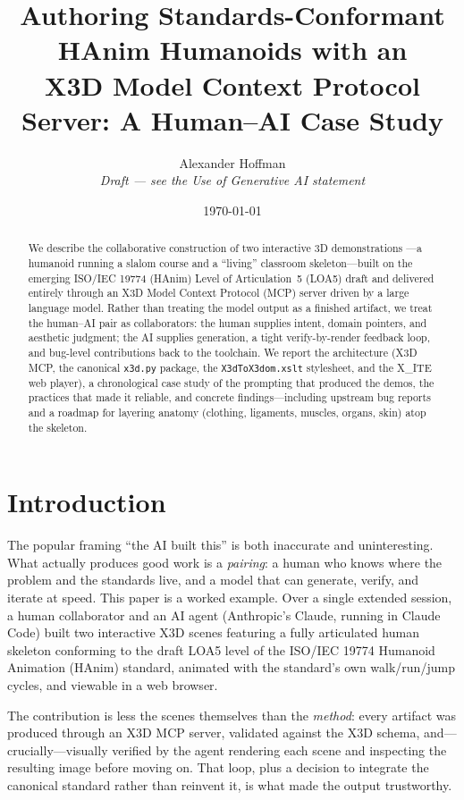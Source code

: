 \documentclass[11pt]{article}
\title{\textbf{Authoring Standards-Conformant HAnim Humanoids with an\\
X3D Model Context Protocol Server: A Human--AI Case Study}}
\author{Alexander Hoffman\\[2pt]
  \small\textit{Draft --- see the Use of Generative AI statement}}
\date{\today}
\begin{document}
\maketitle

\begin{abstract}
We describe the collaborative construction of two interactive 3D demonstrations
---a humanoid running a slalom course and a ``living'' classroom skeleton---built
on the emerging ISO/IEC 19774 (HAnim) Level of Articulation~5 (LOA5) draft and
delivered entirely through an X3D Model Context Protocol (MCP) server driven by a
large language model. Rather than treating the model output as a finished
artifact, we treat the human--AI pair as collaborators: the human supplies intent,
domain pointers, and aesthetic judgment; the AI supplies generation, a tight
verify-by-render feedback loop, and bug-level contributions back to the toolchain.
We report the architecture (X3D MCP, the canonical \texttt{x3d.py} package, the
\texttt{X3dToX3dom.xslt} stylesheet, and the X\_ITE web player), a chronological
case study of the prompting that produced the demos, the practices that made it
reliable, and concrete findings---including upstream bug reports and a roadmap
for layering anatomy (clothing, ligaments, muscles, organs, skin) atop the
skeleton.
\end{abstract}

\section{Introduction}

The popular framing ``the AI built this'' is both inaccurate and uninteresting.
What actually produces good work is a \emph{pairing}: a human who knows where the
problem and the standards live, and a model that can generate, verify, and
iterate at speed. This paper is a worked example. Over a single extended session,
a human collaborator and an AI agent (Anthropic's Claude, running in Claude Code)
built two interactive X3D scenes featuring a fully articulated human skeleton
conforming to the draft LOA5 level of the ISO/IEC 19774 Humanoid Animation
(HAnim) standard, animated with the standard's own walk/run/jump cycles, and
viewable in a web browser.

The contribution is less the scenes themselves than the \emph{method}: every
artifact was produced through an X3D MCP server, validated against the X3D
schema, and---crucially---visually verified by the agent rendering each scene and
inspecting the resulting image before moving on. That loop, plus a decision to
integrate the canonical standard rather than reinvent it, is what made the output
trustworthy.
\end{document}
